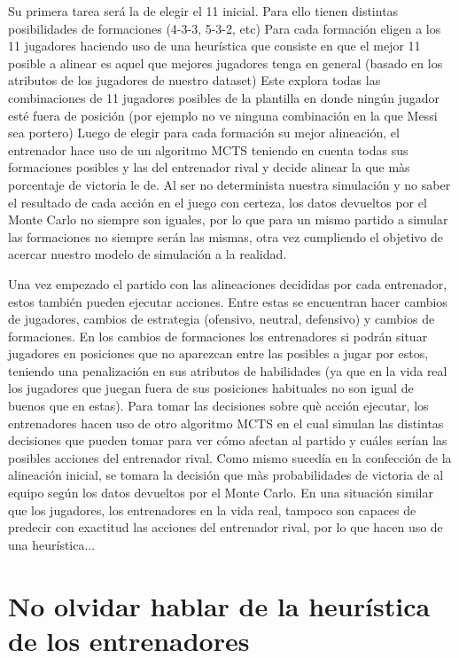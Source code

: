 \documentclass{article}
\begin{document}
Su primera tarea será la de elegir el 11 inicial. Para ello tienen distintas posibilidades de formaciones (4-3-3, 5-3-2, etc) Para cada formación eligen a los 11 jugadores haciendo uso de una heurística que consiste en que el mejor 11 posible a alinear es aquel que mejores jugadores tenga en general (basado en los atributos de los jugadores de nuestro dataset) Este explora todas las combinaciones de 11 jugadores posibles de la plantilla en donde ningún jugador esté fuera de posición (por ejemplo no ve ninguna combinación en la que Messi sea portero) Luego de elegir para cada formación su mejor alineación, el entrenador hace uso de un algoritmo MCTS teniendo en cuenta todas sus formaciones posibles y las del entrenador rival y decide alinear la que màs porcentaje de victoria le de. Al ser no determinista nuestra simulación y no saber el resultado de cada acción en el juego con certeza, los datos devueltos por el Monte Carlo no siempre son iguales, por lo que para un mismo partido a simular las formaciones no siempre serán las mismas, otra vez cumpliendo el objetivo de acercar nuestro modelo de simulación a la realidad.

Una vez empezado el partido con las alineaciones decididas por cada entrenador, estos también pueden ejecutar acciones. Entre estas se encuentran hacer cambios de jugadores, cambios de estrategia (ofensivo, neutral, defensivo) y cambios de formaciones. En los cambios de formaciones los entrenadores si podrán situar jugadores en posiciones que no aparezcan entre las posibles a jugar por estos, teniendo una penalización en sus atributos de habilidades (ya que en la vida real los jugadores que juegan fuera de sus posiciones habituales no son igual de buenos que en estas). Para tomar las decisiones sobre què acción ejecutar, los entrenadores hacen uso de otro algoritmo MCTS en el cual simulan las distintas decisiones que pueden tomar para ver cómo afectan al partido y cuáles serían las posibles acciones del entrenador rival. Como mismo sucedía en la confección de la alineación inicial, se tomara la decisión que màs probabilidades de victoria de al equipo según los datos devueltos por el Monte Carlo. En una situación similar que los jugadores, los entrenadores en la vida real, tampoco son capaces de predecir con exactitud las acciones del entrenador rival, por lo que hacen uso de una heurística...

\section{No olvidar hablar de la heurística de los entrenadores}
\end{document}
